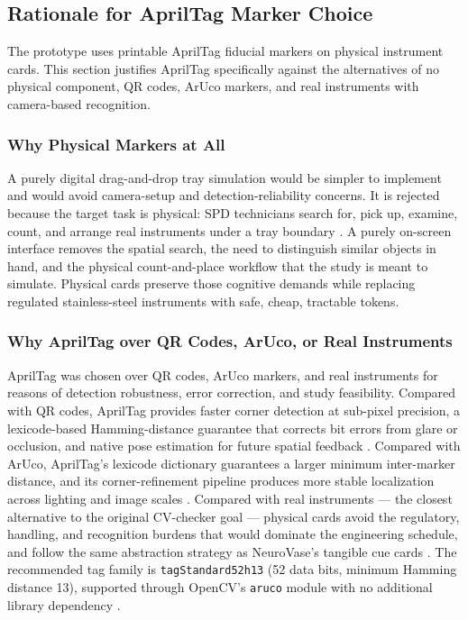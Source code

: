 \documentclass[10pt,a4paper]{article}
\begin{document}
\subsection{Rationale for AprilTag Marker Choice}

The prototype uses printable AprilTag fiducial markers on physical instrument
cards. This section justifies AprilTag specifically against the alternatives of
no physical component, QR codes, ArUco markers, and real instruments with
camera-based recognition.
\subsubsection{Why Physical Markers at All}

A purely digital drag-and-drop tray simulation would be simpler to implement
and would avoid camera-setup and detection-reliability concerns. It is rejected
because the target task is physical: SPD technicians search for,
pick up, examine, count, and arrange real instruments under a tray boundary
\cite{nichol-et-al-2024, alfred-et-al-2021}. A purely on-screen
interface removes the spatial search, the need to distinguish similar objects
in hand, and the physical count-and-place workflow that the study is meant to
simulate. Physical cards preserve those cognitive demands while replacing
regulated stainless-steel instruments with safe, cheap, tractable tokens.
\subsubsection{Why AprilTag over QR Codes, ArUco, or Real Instruments}

AprilTag was chosen over QR codes, ArUco markers, and real instruments for
reasons of detection robustness, error correction, and study feasibility.
Compared with QR codes, AprilTag provides faster corner detection at sub-pixel
precision, a lexicode-based Hamming-distance guarantee that corrects bit errors
from glare or occlusion, and native pose estimation for future spatial feedback
\cite{olson-2011, kalaitzakis-et-al-2021}.
Compared with ArUco, AprilTag's lexicode dictionary guarantees a larger minimum
inter-marker distance, and its corner-refinement pipeline produces more stable
localization across lighting and image scales
\cite{wang-et-al-2016-apriltag, garrido-jurado-et-al-2014, romero-ramirez-et-al-2018}. Compared with
real instruments --- the closest alternative to the original CV-checker goal ---
physical cards avoid the regulatory, handling, and recognition burdens that
would dominate the engineering schedule, and follow the same abstraction
strategy as NeuroVase's tangible cue cards
\cite{jahani-et-al-2026-neurovase, kienle-et-al-2025}. The recommended tag
family is \texttt{tagStandard52h13} (52 data bits, minimum Hamming distance 13),
supported through OpenCV's \texttt{aruco} module with no additional library dependency
\cite{krogius-et-al-2019, opencv-aruco-detection-accessed-2026}.
\end{document}
